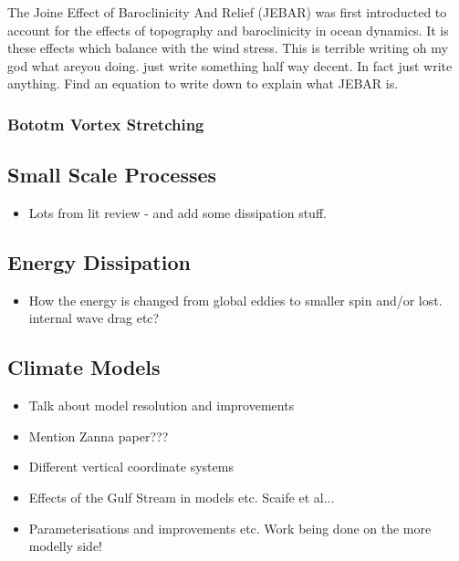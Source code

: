 \documentclass[..\EOYR.tex]{subfiles}
\begin{document}


The Joine Effect of Baroclinicity And Relief (JEBAR) was first introducted to account for the effects of topography and baroclinicity in ocean dynamics. It is these effects which balance with the wind stress. This is terrible writing oh my god what areyou doing. just write something half way decent. In fact just write anything. Find an equation to write down to explain what JEBAR is.

\subsubsection*{Bototm Vortex Stretching}

\subsection{Small Scale Processes}
\begin{itemize}
    \item Lots from lit review - and add some dissipation stuff.
\end{itemize}

\subsection{Energy Dissipation}
\begin{itemize}
    \item How the energy is changed from global eddies to smaller spin and/or lost. internal wave drag etc?
\end{itemize}

\subsection{Climate Models}
\begin{itemize}
    \item Talk about model resolution and improvements
    \item Mention Zanna paper???
    \item Different vertical coordinate systems
    \item Effects of the Gulf Stream in models etc. Scaife et al...
    \item Parameterisations and improvements etc. Work being done on the more modelly side!
\end{itemize}
\end{document}
